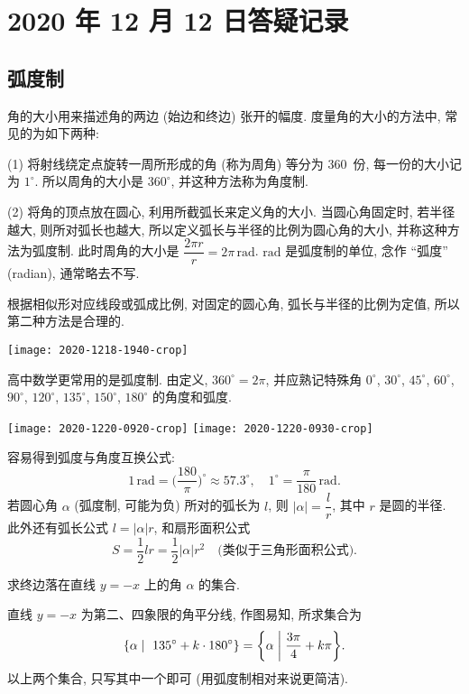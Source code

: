 \section{2020 年 12 月 12 日答疑记录}

\subsection{弧度制}

角的大小用来描述角的两边 (始边和终边) 张开的幅度. 度量角的大小的方法中, 常见的为如下两种:

(1) 将射线绕定点旋转一周所形成的角 (称为周角) 等分为 $360$~份, 每一份的大小记为 $1^\circ$. 所以周角的大小是 $360^\circ$, 并这种方法称为角度制. 

(2) 将角的顶点放在圆心, 利用所截弧长来定义角的大小. 当圆心角固定时, 若半径越大, 则所对弧长也越大, 所以定义弧长与半径的比例为圆心角的大小, 并称这种方法为弧度制. 此时周角的大小是 $\dfrac{2\pi r}r= 2\pi\,\mathrm{rad}$. $\mathrm{rad}$ 是弧度制的单位, 念作 ``弧度'' (radian), 通常略去不写.

根据相似形对应线段或弧成比例, 对固定的圆心角, 弧长与半径的比例为定值, 所以第二种方法是合理的. 

    \begin{center}
        \texttt{[image: 2020-1218-1940-crop]}
    \end{center}
    
高中数学更常用的是弧度制. 由定义, $360^\circ =2\pi$, 并应熟记特殊角 $0^\circ$, $30^\circ$, $45^\circ$, $60^\circ$, $90^\circ$, $120^\circ$, $135^\circ$, $150^\circ$, $180^\circ$ 的角度和弧度.

    \begin{center}
        \texttt{[image: 2020-1220-0920-crop]}\quad
        \texttt{[image: 2020-1220-0930-crop]}
    \end{center}
    
容易得到弧度与角度互换公式: 
\[1\,\mathrm{rad}= \Big(\frac{180}{\pi}\Big)^{\circ} \approx 57.3^{\circ}, \quad
    1^{\circ}= \frac{\pi}{180}\,\mathrm{rad}.\]
若圆心角 $\alpha$ (弧度制, 可能为负) 所对的弧长为 $l$, 则 $|\alpha|=\dfrac{l}{r}$, 其中 $r$ 是圆的半径. 此外还有弧长公式 $l=|\alpha|r$, 和扇形面积公式
\[S= \dfrac{1}{2}lr= \dfrac{1}{2}|\alpha| r^2\quad 
    \text{(类似于三角形面积公式)}.\]

\begin{example}
    求终边落在直线 $y=-x$ 上的角 $\alpha$ 的集合.
\end{example}
\begin{solution}
    直线 $y=-x$ 为第二、四象限的角平分线, 作图易知, 所求集合为
    \[\{\alpha\mid\ 135^\circ+k\cdot 180^\circ\}
        = \biggl\{\alpha\biggm| \frac{3\pi}4+k\pi\biggr\}.\]
    以上两个集合, 只写其中一个即可 (用弧度制相对来说更简洁).
\end{solution}

